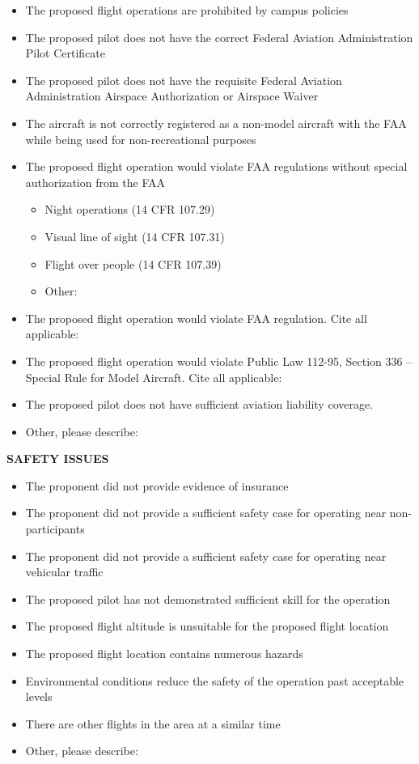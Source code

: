 \documentclass[
]{book}
\providecommand{\tightlist}{%
  \setlength{\itemsep}{0pt}\setlength{\parskip}{0pt}}
\begin{document}
\begin{itemize}
\tightlist
\item
  The proposed flight operations are prohibited by campus policies
\item
  The proposed pilot does not have the correct Federal Aviation Administration Pilot Certificate
\item
  The proposed pilot does not have the requisite Federal Aviation Administration Airspace Authorization or Airspace Waiver
\item
  The aircraft is not correctly registered as a non-model aircraft with the FAA while being used for non-recreational purposes
\item
  The proposed flight operation would violate FAA regulations without special authorization from the FAA

  \begin{itemize}
  \tightlist
  \item
    Night operations (14 CFR 107.29)
  \item
    Visual line of sight (14 CFR 107.31)
  \item
    Flight over people (14 CFR 107.39)
  \item
    Other:
  \end{itemize}
\item
  The proposed flight operation would violate FAA regulation. Cite all applicable:
\item
  The proposed flight operation would violate Public Law 112-95, Section 336 -- Special Rule for Model Aircraft. Cite all applicable:
\item
  The proposed pilot does not have sufficient aviation liability coverage.
\item
  Other, please describe:
\end{itemize}

\textbf{SAFETY ISSUES}

\begin{itemize}
\tightlist
\item
  The proponent did not provide evidence of insurance
\item
  The proponent did not provide a sufficient safety case for operating near non-participants
\item
  The proponent did not provide a sufficient safety case for operating near vehicular traffic
\item
  The proposed pilot has not demonstrated sufficient skill for the operation
\item
  The proposed flight altitude is unsuitable for the proposed flight location
\item
  The proposed flight location contains numerous hazards
\item
  Environmental conditions reduce the safety of the operation past acceptable levels
\item
  There are other flights in the area at a similar time
\item
  Other, please describe:
\end{itemize}
\end{document}
